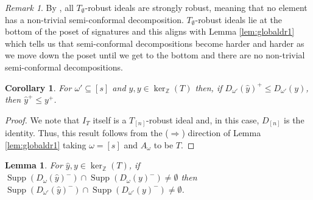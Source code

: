\documentclass[a4paper, 12pt]{article}
\newcommand{\ZZ}{\mathbb Z}
\theoremstyle{plain}
\newtheorem{lemma}[theorem]{Lemma}
\newtheorem{corollary}[theorem]{Corollary}
\theoremstyle{definition}
\theoremstyle{remark}
\newtheorem{remark}[theorem]{Remark}
\begin{document}
\begin{remark}
    By \cite[Corollary 4.4]{petrovic2018bouquet}, all $T_{\emptyset}$-robust ideals are strongly robust, meaning that no element has a non-trivial semi-conformal decomposition. $T_{\emptyset}$-robust ideals lie at the bottom of the poset of signatures and this aligns with Lemma \ref{lem:globaldr1} which tells us that semi-conformal decompositions become harder and harder as we move down the poset until we get to the bottom and there are no non-trivial semi-conformal decompositions.
\end{remark}

\begin{corollary}\label{cor:globaldr1}
    For $\omega' \subseteq [s]$ and $\hat y, y \in \ker_\ZZ(T)$ then, if $D_{\omega'}(\hat y)^+ \le D_{\omega'}(y)$, then $\hat y^+ \le y^+$.
\end{corollary}

\begin{proof}
    We note that $I_T$ itself is a $T_{[n]}$-robust ideal and, in this case, $D_{[n]}$ is the identity. Thus, this result follows from the ($\Rightarrow$) direction of Lemma \ref{lem:globaldr1} taking $\omega=[s]$ and $A_{\omega}$ to be $T$.
\end{proof}

\begin{lemma} \label{lem:globaldr2}
    For $\hat y,y \in \ker_\ZZ(T)$, if $\operatorname{Supp}(D_{\omega}(\hat y)^-) \cap \operatorname{Supp}(D_{\omega}(y)^-) \neq \emptyset$ then $\operatorname{Supp}(D_{\omega'}(\hat y)^-) \cap \operatorname{Supp}(D_{\omega'}(y)^-) \neq \emptyset$.
\end{lemma}
\end{document}
